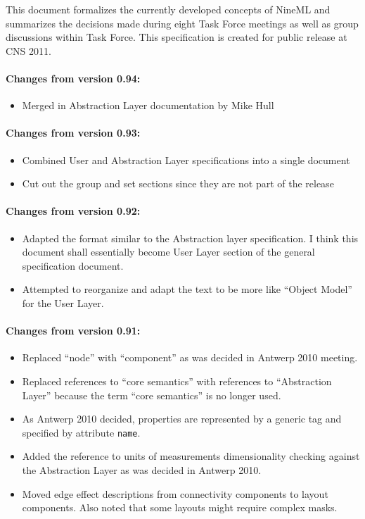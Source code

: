 \documentclass{article}
\begin{document}
\tableofcontents
\newpage

\abstract
This document formalizes the currently developed concepts of NineML and
summarizes the decisions made during eight Task Force meetings as well
as group discussions within Task Force. This specification is created for
public release at CNS 2011.

\vskip 1in

\paragraph{Changes from version 0.94:}
\begin{itemize}
\item Merged in Abstraction Layer documentation by Mike Hull
\end{itemize}

\paragraph{Changes from version 0.93:}
\begin{itemize}
\item Combined User and Abstraction Layer specifications into a single document
\item Cut out the group and set sections since they are not part of the release
\end{itemize}

\paragraph{Changes from version 0.92:}
\begin{itemize}
\item Adapted the format similar to the Abstraction layer specification.
I think this document shall essentially become User Layer section of the
general specification document.
\item Attempted to reorganize and adapt the text to be more like ``Object
Model'' for the User Layer.
\end{itemize}

\paragraph{Changes from version 0.91:}
\begin{itemize}
\item Replaced ``node'' with ``component'' as was decided in Antwerp 2010
meeting.
\item Replaced references to ``core semantics'' with references to
``Abstraction Layer''
because the term ``core semantics'' is no longer used.
\item As Antwerp 2010 decided, properties are represented by a generic
tag and specified
by attribute {\tt name}.
\item Added the reference to units of measurements dimensionality checking
against
the Abstraction Layer as was decided in Antwerp 2010.
\item Moved edge effect descriptions from connectivity components to layout
components. Also
noted that some layouts might require complex masks.
\end{itemize}
\end{document}
